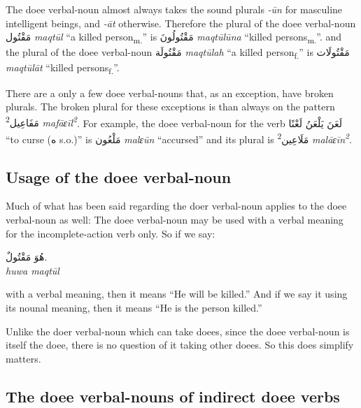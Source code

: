\documentclass[
  10pt,
]{book}
\begin{document}
The doee verbal-noun almost always takes the sound plurals \emph{-ūn} for masculine intelligent beings, and \emph{-āt} otherwise. Therefore the plural of the doee verbal-noun
\foreignlanguage{arabic}{مَقْتُول} \emph{maqtūl} \enquote{a killed person\textsubscript{m.}} is \foreignlanguage{arabic}{مَقْتُولُونَ} \emph{maqtūlūna} \enquote{killed persons\textsubscript{m.}}.
and the plural of the doee verbal-noun
\foreignlanguage{arabic}{مَقْتُولَة} \emph{maqtūlah} \enquote{a killed person\textsubscript{f.}} is \foreignlanguage{arabic}{مَقْتُولَات} \emph{maqtūlāt} \enquote{killed persons\textsubscript{f.}}.

There are a only a few doee verbal-nouns that, as an exception, have broken plurals. The broken plural for these exceptions is than always on the pattern \foreignlanguage{arabic}{مَفَاعِيل\textsuperscript{2}} \emph{mafāɛīl\textsuperscript{2}}. For example, the doee verbal-noun for the verb
\foreignlanguage{arabic}{لَعَنَ يَلْعَنُ لَعْنًا} \enquote{to curse (\foreignlanguage{arabic}{ه} s.o.)} is \foreignlanguage{arabic}{مَلْعُون} \emph{malɛūn} \enquote{accursed} and its plural is \foreignlanguage{arabic}{مَلَاعِين\textsuperscript{2}} \emph{malāɛīn\textsuperscript{2}}.

\subsection{Usage of the doee verbal-noun}\label{usage-of-the-doee-verbal-noun}

Much of what has been said regarding the doer verbal-noun applies to the doee verbal-noun as well: The doee verbal-noun may be used with a verbal meaning for the incomplete-action verb only. So if we say:

\foreignlanguage{arabic}{هُوَ مَقْتُولٌ.}\\
\emph{huwa maqtūl}

with a verbal meaning, then it means \enquote{He will be killed.} And if we say it using its nounal meaning, then it means \enquote{He is the person killed.}

Unlike the doer verbal-noun which can take doees, since the doee verbal-noun is itself the doee, there is no question of it taking other doees. So this does simplify matters.

\subsection{The doee verbal-nouns of indirect doee verbs}\label{the-doee-verbal-nouns-of-indirect-doee-verbs}
\end{document}

